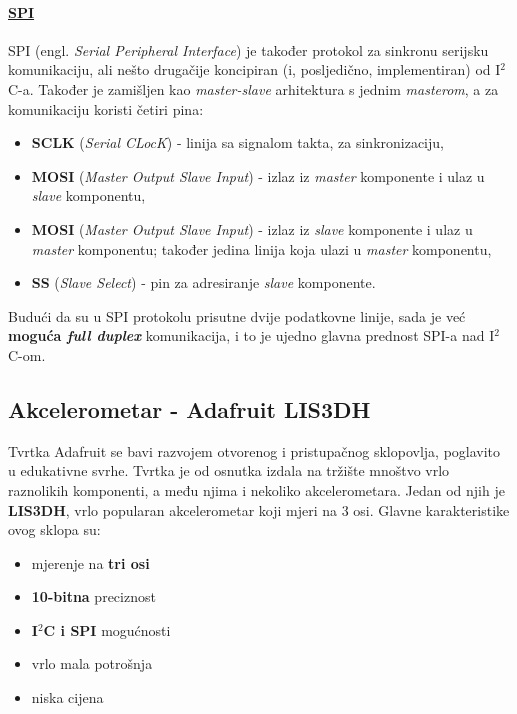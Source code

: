 \documentclass[12pt,a4paper]{article}
\begin{document}
	\paragraph{\underline{SPI}} %
	\label{par:spi}
		SPI (engl. \textit{Serial Peripheral Interface}) je također protokol za sinkronu serijsku komunikaciju, ali nešto drugačije koncipiran (i, posljedično, implementiran) od I$^2$C-a. Također je zamišljen kao \textit{master-slave} arhitektura s jednim \textit{masterom}, a za komunikaciju koristi četiri pina:
		\begin{itemize}
			\item \textbf{SCLK} (\textit{Serial CLocK}) - linija sa signalom takta, za sinkronizaciju,
			\item \textbf{MOSI} (\textit{Master Output Slave Input}) - izlaz iz \textit{master} komponente i ulaz u \textit{slave} komponentu,
			\item \textbf{MOSI} (\textit{Master Output Slave Input}) - izlaz iz \textit{slave} komponente i ulaz u \textit{master} komponentu; također jedina linija koja ulazi u \textit{master} komponentu,
			\item \textbf{SS} (\textit{Slave Select}) - pin za adresiranje \textit{slave} komponente.
		\end{itemize}

		Budući da su u SPI protokolu prisutne dvije podatkovne linije, sada je već \textbf{moguća \textit{full duplex}} komunikacija, i to je ujedno glavna prednost SPI-a nad I$^2$C-om.

	\newpage
	\subsection{Akcelerometar - Adafruit LIS3DH}
		Tvrtka Adafruit se bavi razvojem otvorenog i pristupačnog sklopovlja, poglavito u edukativne svrhe. Tvrtka je od osnutka izdala na tržište mnoštvo vrlo raznolikih komponenti, a među njima i nekoliko akcelerometara. Jedan od njih je \textbf{LIS3DH}, vrlo popularan akcelerometar koji mjeri na 3 osi. Glavne karakteristike ovog sklopa su:
		\begin{itemize}
			\item mjerenje na \textbf{tri osi}
			\item \textbf{10-bitna} preciznost
			\item \textbf{I$^2$C i SPI} mogućnosti
			\item vrlo mala potrošnja
			\item niska cijena
		\end{itemize}
\end{document}
